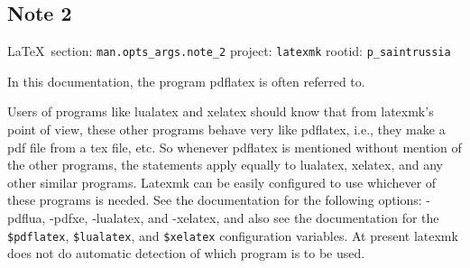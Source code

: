  
 

\subsection{Note 2}
  
\vspace{0.5cm}
 {\ifDEBUG\small\LaTeX~section: \verb|man.opts_args.note_2| project: \verb|latexmk| rootid: \verb|p_saintrussia| \fi}
\vspace{0.5cm}
  
In this documentation, the program pdflatex is often referred to.

Users of programs like lualatex and xelatex should know that  from latexmk's
point  of view, these other programs behave very like pdflatex, i.e., they
make a pdf file from a  tex  file,  etc.   So  whenever pdflatex is mentioned
without mention of the other programs, the statements apply equally to
lualatex, xelatex, and any  other  similar  programs.  Latexmk can be easily
configured to use whichever of these programs is needed.  See the
documentation  for  the  following  options: -pdflua,  -pdfxe,  -lualatex, and
-xelatex, and also see the documentation for the \verb|$pdflatex|,
\verb|$lualatex|,  and  \verb|$xelatex|  configuration  variables.   At
present  latexmk  does not do automatic detection of which program is to be
used.

